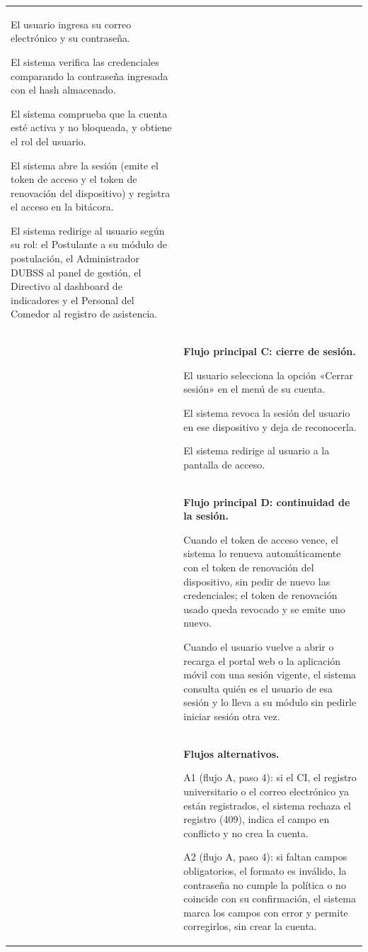 \begin{longtable}{>{\raggedright\arraybackslash}p{2.9cm} >{\raggedright\arraybackslash}p{12.6cm}}
\begin{cupasos}
    \item El usuario ingresa su correo electrónico y su contraseña.
    \item El sistema verifica las credenciales comparando la contraseña ingresada con el hash almacenado.
    \item El sistema comprueba que la cuenta esté activa y no bloqueada, y obtiene el rol del usuario.
    \item El sistema abre la sesión (emite el token de acceso y el token de renovación del dispositivo) y registra el acceso en la bitácora.
    \item El sistema redirige al usuario según su rol: el Postulante a su módulo de postulación, el Administrador DUBSS al panel de gestión, el Directivo al dashboard de indicadores y el Personal del Comedor al registro de asistencia.
\end{cupasos} \\
 & \textbf{Flujo principal C: cierre de sesión.}
\begin{cupasos}
    \item El usuario selecciona la opción «Cerrar sesión» en el menú de su cuenta.
    \item El sistema revoca la sesión del usuario en ese dispositivo y deja de reconocerla.
    \item El sistema redirige al usuario a la pantalla de acceso.
\end{cupasos} \\
 & \textbf{Flujo principal D: continuidad de la sesión.}
\begin{cupasos}
    \item Cuando el token de acceso vence, el sistema lo renueva automáticamente con el token de renovación del dispositivo, sin pedir de nuevo las credenciales; el token de renovación usado queda revocado y se emite uno nuevo.
    \item Cuando el usuario vuelve a abrir o recarga el portal web o la aplicación móvil con una sesión vigente, el sistema consulta quién es el usuario de esa sesión y lo lleva a su módulo sin pedirle iniciar sesión otra vez.
\end{cupasos} \\
 & \textbf{Flujos alternativos.}
\begin{cuvin}
    \item A1 (flujo A, paso 4): si el CI, el registro universitario o el correo electrónico ya están registrados, el sistema rechaza el registro (409), indica el campo en conflicto y no crea la cuenta.
    \item A2 (flujo A, paso 4): si faltan campos obligatorios, el formato es inválido, la contraseña no cumple la política o no coincide con su confirmación, el sistema marca los campos con error y permite corregirlos, sin crear la cuenta.

\end{cuvin}
\end{longtable}
